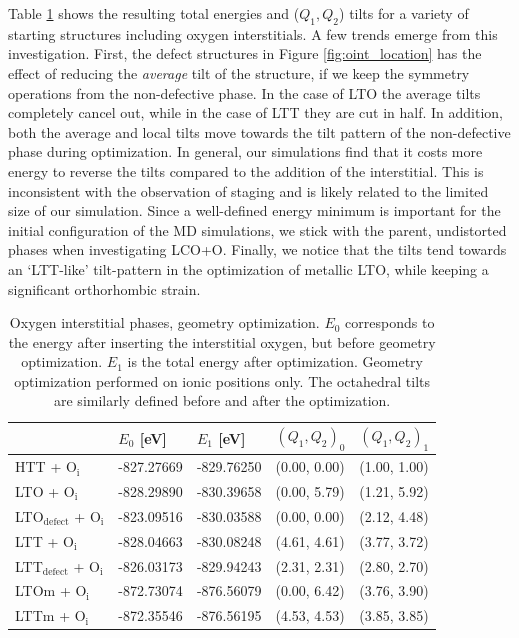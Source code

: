 Table \ref{tab:oint_lcoo_en} shows the resulting total energies and ($Q_1, Q_2$) tilts for a variety of starting structures including oxygen interstitials. A few trends emerge from this investigation. First, the defect structures in Figure \ref{fig:oint_location} has the effect of reducing the \emph{average} tilt of the structure, if we keep the symmetry operations from the non-defective phase. In the case of LTO the average tilts completely cancel out, while in the case of LTT they are cut in half. In addition, both the average and local tilts move towards the tilt pattern of the non-defective phase during optimization. In general, our simulations find that it costs more energy to reverse the tilts compared to the addition of the interstitial. This is inconsistent with the observation of staging and is likely related to the limited size of our simulation. Since a well-defined energy minimum is important for the initial configuration of the MD simulations, we stick with the parent, undistorted phases when investigating LCO+O. Finally, we notice that the tilts tend towards an `LTT-like' tilt-pattern in the optimization of metallic LTO, while keeping a significant orthorhombic strain. 

\begin{table}[b]
	\centering
	\caption[Oxygen interstitial phases: Energy]{Oxygen interstitial phases, geometry optimization. $E_0$ corresponds to the energy after inserting the interstitial oxygen, but before geometry optimization. $E_1$ is the total energy after optimization. Geometry optimization performed on ionic positions only. The octahedral tilts are similarly defined before and after the optimization.}
	\label{tab:oint_lcoo_en}
	\begin{tabular}{@{}lllll@{}}
    \toprule
	 & $E_0$ [eV] & $E_1$ [eV] & $(Q_1, Q_2)_0$ & $(Q_1, Q_2)_1$  \\ 
	\midrule
    HTT + O$_\text{i}$                    & -827.27669             & -829.76250 & (0.00, 0.00) & (1.00, 1.00) \\
    LTO + O$_\text{i}$                    & -828.29890             & -830.39658  & (0.00, 5.79) & (1.21, 5.92) \\
    LTO$_\text{defect}$ + O$_\text{i}$            & -823.09516             & -830.03588  & (0.00, 0.00) & (2.12, 4.48) \\
    LTT + O$_\text{i}$                    & -828.04663             & -830.08248  & (4.61, 4.61) & (3.77, 3.72) \\
	LTT$_\text{defect}$ + O$_\text{i}$             & -826.03173             & -829.94243  & (2.31, 2.31) & (2.80, 2.70) \\
	LTOm + O$_\text{i}$                & -872.73074             & -876.56079  & (0.00, 6.42) & (3.76, 3.90) \\
	LTTm + O$_\text{i}$                & -872.35546             & -876.56195  & (4.53, 4.53) & (3.85, 3.85) \\
	\bottomrule
    \end{tabular}
\end{table}

